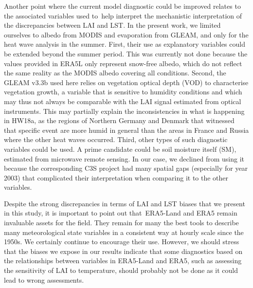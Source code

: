 \documentclass[gmd, manuscript]{copernicus}
\begin{document}
{Another point where the current model diagnostic could be improved
relates to the associated variables used to~help interpret the
mechanistic interpretation of the discrepancies between LAI and LST. In
the present work, we limited ourselves to albedo from MODIS and
evaporation from GLEAM, and only for the heat wave analysis in the
summer. First, their use as explanatory variables could be extended
beyond the summer period. This was currently not done because the values
provided in ERA5L only represent snow-free albedo, which do not reflect
the same reality as the MODIS albedo covering all conditions. Second,
the GLEAM v3.3b used here relies on vegetation optical depth (VOD) to
characterise vegetation growth, a variable that is sensitive to humidity
conditions and which may thus not always be comparable with the LAI
signal estimated from optical instruments. This may partially explain
the inconsistencies in what is happening in HW18a, as the regions of
Northern Germany and Denmark that witnessed that specific event are more
humid in general than the areas in France and Russia where the other
heat waves occurred. Third, other types of such diagnostic variables
could be used. A prime candidate could be soil moisture itself (SM),
estimated from microwave remote sensing. In our case, we declined from
using it because the corresponding C3S project had many spatial gaps
(especially for year 2003) that complicated their interpretation when
comparing it to the other variables.

Despite the strong discrepancies in terms of LAI and LST biases that we
present in this study, it is important to point out that~ERA5-Land and
ERA5 remain invaluable assets for the field. They remain for many the
best tools to describe many meteorological state variables in a
consistent way at hourly scale since the 1950s. We certainly continue to
encourage their use. However, we should stress that the biases we expose
in our results indicate that some diagnostics based on the relationships
between variables in ERA5-Land and ERA5, such as assessing the
sensitivity of LAI to temperature, should probably not be done as it
could lead to wrong assessments.


\conclusions  %

}
\end{document}

